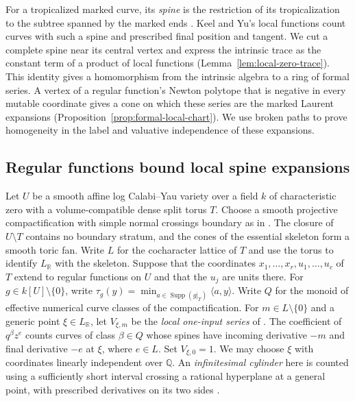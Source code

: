 \documentclass[11pt,reqno]{amsart}
\numberwithin{equation}{section}
\theoremstyle{definition}
\theoremstyle{remark}
\DeclareMathOperator{\Supp}{Supp}
\begin{document}
For a tropicalized marked curve, its \emph{spine} is the restriction
of its tropicalization to the subtree spanned by the marked ends
\cite[Proposition~4.24]{KY}. Keel and Yu's local functions count
curves with such a spine and prescribed final position and tangent.
We cut a complete spine near its central vertex and express
the intrinsic trace as the constant term of a product of local functions
(Lemma~\ref{lem:local-zero-trace}). This identity gives a homomorphism
from the intrinsic algebra to a ring of formal series. A vertex of a
regular function's Newton polytope that is negative in every mutable
coordinate gives a cone on which these series are the marked Laurent
expansions (Proposition~\ref{prop:formal-local-chart}). We use broken
paths to prove homogeneity in the label and valuative independence of
these expansions.

\subsection{Regular functions bound local spine expansions}
\label{subsec:local-spine-support}

Let \(U\) be a smooth affine log Calabi--Yau variety over a field \(k\)
of characteristic zero with a volume-compatible dense split torus \(T\).
Choose a smooth projective compactification with simple normal crossings
boundary as in \cite[Assumption~2.4]{KY}. The closure of \(U\setminus T\)
contains no boundary stratum, and the cones of the essential skeleton
form a smooth toric fan. Write
\(L\) for the cocharacter lattice of \(T\) and use the torus to
identify \(L_{\mathbb R}\) with the skeleton. Suppose that the
coordinates \(x_1,\ldots,x_r,u_1,\ldots,u_c\) of \(T\) extend to
regular functions on \(U\) and that the \(u_j\) are units there.
For \(g\in k[U]\setminus\{0\}\), write
\(\tau_g(y)=\min_{a\in\Supp(g|_T)}\langle a,y\rangle\).
Write \(Q\) for the monoid of effective numerical curve classes of
the compactification. For \(m\in L\setminus\{0\}\) and a generic
point \(\xi\in L_{\mathbb R}\), let \(V_{\xi,m}\) be the
\emph{local one-input series} of \cite[Definition~20.20]{KY}.
The coefficient of \(q^\beta z^e\) counts curves of class
\(\beta\in Q\) whose spines have incoming derivative \(-m\) and
final derivative \(-e\) at \(\xi\), where \(e\in L\). Set \(V_{\xi,0}=1\).
We may choose \(\xi\) with coordinates linearly independent over
\(\mathbb Q\). An \emph{infinitesimal cylinder} here is counted using
a sufficiently short interval crossing a rational hyperplane at a
general point, with prescribed derivatives on its two sides
\cite[Definition~20.2]{KY}.
\end{document}
